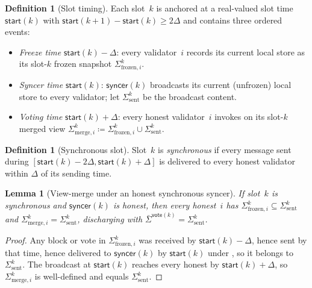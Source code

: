 \ifx\litemode\undefined\documentclass{article}\fi
\newcommand{\syncer}{\mathsf{syncer}}
\newcommand{\start}{\mathsf{start}}
\newcommand{\vote}{\mathsf{vote}}
\newcommand{\comm}[1]{\bar{#1}}
\theoremstyle{plain}
\newtheorem{lemma}{Lemma}
\theoremstyle{definition}
\newtheorem{definition}[theorem]{Definition}
\theoremstyle{remark}
\begin{document}
\begin{definition}[Slot timing]\label{rev:def:slot-timing}
Each slot~$k$ is anchored at a real-valued slot time $\start(k)$ with $\start(k+1) - \start(k) \geq 2\Delta$ and contains three ordered events:
\begin{itemize}
  \item \emph{Freeze time} $\start(k) - \Delta$: every validator~$i$ records its current local store as its slot-$k$ frozen snapshot $\Sigma^k_{\mathrm{frozen},i}$.
  \item \emph{Syncer time} $\start(k)$: $\syncer(k)$ broadcasts its current (unfrozen) local store to every validator; let $\Sigma^k_{\mathrm{sent}}$ be the broadcast content.
  \item \emph{Voting time} $\start(k) + \Delta$: every honest validator~$i$ invokes  on its slot-$k$ merged view $\Sigma^k_{\mathrm{merge},i} \coloneqq \Sigma^k_{\mathrm{frozen},i} \cup \Sigma^k_{\mathrm{sent}}$.
\end{itemize}
\end{definition}

\begin{definition}[Synchronous slot]\label{rev:def:synchrony-window}
Slot~$k$ is \emph{synchronous} if every message sent during $[\start(k) - 2\Delta, \start(k) + \Delta]$ is delivered to every honest validator within $\Delta$ of its sending time.
\end{definition}

\begin{lemma}[View-merge under an honest synchronous syncer]\label{rev:lem:view-merge}
If slot~$k$ is synchronous and $\syncer(k)$ is honest, then every honest~$i$ has $\Sigma^k_{\mathrm{frozen},i} \subseteq \Sigma^k_{\mathrm{sent}}$ and $\Sigma^k_{\mathrm{merge},i} = \Sigma^k_{\mathrm{sent}}$, discharging  with $\comm{\Sigma}^{\vote(k)} = \Sigma^k_{\mathrm{sent}}$.
\end{lemma}

\begin{proof}
Any block or vote in $\Sigma^k_{\mathrm{frozen},i}$ was received by $\start(k) - \Delta$, hence sent by that time, hence delivered to $\syncer(k)$ by $\start(k)$ under , so it belongs to $\Sigma^k_{\mathrm{sent}}$.
The broadcast at $\start(k)$ reaches every honest by $\start(k) + \Delta$, so $\Sigma^k_{\mathrm{merge},i}$ is well-defined and equals $\Sigma^k_{\mathrm{sent}}$.
\end{proof}
\end{document}
